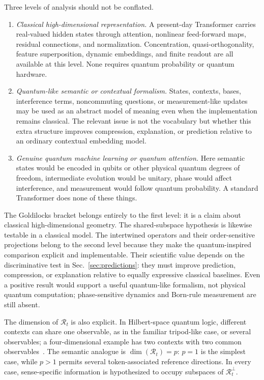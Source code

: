 \documentclass[
  aps,
  reprint,
  superscriptaddress,
  floatfix,
  nofootinbib,
  longbibliography
]{revtex4-2}
\begin{document}
Three levels of analysis should not be conflated.
%
\begin{enumerate}
\item \emph{Classical high-dimensional representation.}
A present-day Transformer carries real-valued hidden states through
attention, nonlinear feed-forward maps, residual connections, and
normalization.  Concentration, quasi-orthogonality, feature superposition,
dynamic embeddings, and finite readout are all available at this level.
None requires quantum probability or quantum hardware.

\item \emph{Quantum-like semantic or contextual formalism.}
States, contexts, bases, interference terms, noncommuting questions, or
measurement-like updates may be used as an abstract model of meaning even
when the implementation remains classical.  The relevant issue is not the
vocabulary but whether this extra structure improves compression,
explanation, or prediction relative to an ordinary contextual embedding
model.

\item \emph{Genuine quantum machine learning or quantum attention.}
Here semantic states would be encoded in qubits or other physical quantum
degrees of freedom, intermediate evolution would be unitary, phase would
affect interference, and measurement would follow quantum probability.  A
standard Transformer does none of these things.
\end{enumerate}
%

The Goldilocks bracket belongs entirely to the first level: it is a claim
about classical high-dimensional geometry.  The shared-subspace hypothesis
is likewise testable in a classical model.  The intertwined operators and
their order-sensitive projections belong to the second level because they
make the quantum-inspired comparison explicit and implementable.  Their
scientific value depends on the discriminative test in
Sec.~\ref{sec:predictions}: they must improve prediction, compression, or
explanation relative to equally expressive classical baselines. Even a
positive result would support a useful quantum-like formalism, not physical
quantum computation; phase-sensitive dynamics and Born-rule measurement are
still absent.

The dimension of $\mathcal R_t$ is also explicit. In Hilbert-space quantum
logic, different contexts can share one observable, as in the familiar
tripod-like case, or several observables; a four-dimensional example has
two contexts with two common observables~\cite{svozil:040102}. The semantic
analogue is $\dim(\mathcal R_t)=p$: $p=1$ is the simplest case, while
$p>1$ permits several token-associated reference directions. In every case,
sense-specific information is hypothesized to occupy subspaces of
$\mathcal R_t^\perp$.
\end{document}
